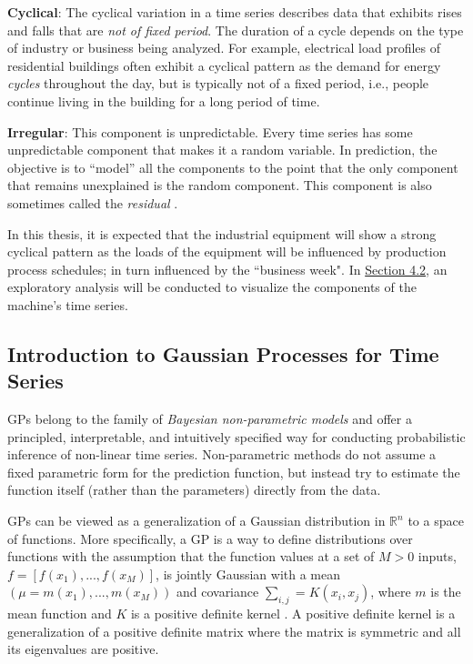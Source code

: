 \textbf{Cyclical}: The cyclical variation in a time series describes data that exhibits rises and falls that are \textit{not of fixed period}. The duration of a cycle depends on the type of industry or business being analyzed. For example, electrical load profiles of residential buildings often exhibit a cyclical pattern as the demand for energy \textit{cycles} throughout the day, but is typically not of a fixed period, i.e., people continue living in the building for a long period of time. 

\textbf{Irregular}: This component is unpredictable. Every time series has some unpredictable component that makes it a random variable. In prediction, the objective is to “model” all the components to the point that the only component that remains unexplained is the random component. This component is also sometimes called the \textit{residual} \cite{tsa}. 

In this thesis, it is expected that the industrial equipment will show a strong cyclical pattern as the loads of the equipment will be influenced by production process schedules; in turn influenced by the ``business week". In \hyperlink{subsection.4.2}{Section 4.2}, an exploratory analysis will be conducted to visualize the components of the machine's time series. 


\subsection{Introduction to Gaussian Processes for Time Series}

\ac{GPs} belong to the family of \textit{Bayesian non-parametric models} and offer a principled, interpretable, and intuitively specified way for conducting probabilistic inference of non-linear time series. Non-parametric methods do not assume a fixed parametric form for the prediction function, but instead try to estimate the function itself (rather than the parameters) directly from the data. 

GPs can be viewed as a generalization of a Gaussian distribution in $\mathbb{R}^n$ to a space of functions. More specifically, a GP is a way to define distributions over functions with the assumption that the function values at a set of $M > 0$ inputs, $f = [f(x_1), . . .,f(x_M)]$, is jointly Gaussian with a mean $(\mu = m(x_1), . . .,m(x_M))$ and covariance $\sum_{i, j} = K(x_i, x_j)$, where $m$ is the mean function and $K$ is a positive definite kernel \cite{pml1Book}. A positive definite kernel is a generalization of a positive definite matrix where the matrix is symmetric and all its eigenvalues are positive. 

